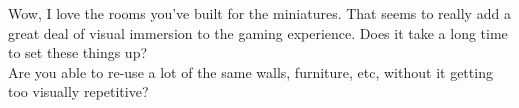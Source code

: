 Wow, I love the rooms you've built for the miniatures. That seems to really add a great deal of visual immersion to the gaming experience. Does it take a long time to set these things up?\\

Are you able to re-use a lot of the same walls, furniture, etc, without it getting too visually repetitive?\\

